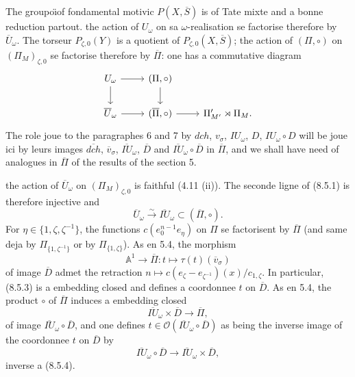 \documentclass[11pt,a4paper]{article}
\theoremstyle{plain}
\theoremstyle{definition}
\newcommand{\dch}{\mathit{dch}}
\newcommand{\A}{\mathbb{A}}
\begin{document}
\subsection{}
The groupo\"{\i}of fondamental motivic $P(X, \overline{S})$ is of Tate mixte and a bonne reduction partout. the action of $U_\omega$ on sa $\omega$-realisation se factorise therefore by $\overline{U}_\omega$. The torseur $P_{\zeta,0}(Y)$ is a quotient of $P_{\zeta,0}(X, \overline{S})$; the action of $(\Pi, \circ)$ on $(\Pi_M)_{\zeta,0}$ se factorise therefore by $\overline{\Pi}$: one has a commutative diagram
\begin{equation}\label{eq:8.5.1}
\begin{tikzcd}
U_\omega \arrow{r} \arrow{d} & (\Pi, \circ) \arrow{d} \\
\overline{U}_\omega \arrow{r} & (\overline{\Pi}, \circ) \arrow{r} & \Pi'_{M'} \rtimes \Pi_M.
\end{tikzcd}
\end{equation}
The role joue to the paragraphes 6 and 7 by $\dch$, $v_\sigma$, $IU_\omega$, $D$, $IU_\omega \circ D$ will be joue ici by leurs images $\overline{\dch}$, $\overline{v}_\sigma$, $\overline{IU}_\omega$, $\overline{D}$ and $\overline{IU}_\omega \circ \overline{D}$ in $\overline{\Pi}$, and we shall have need of analogues in $\overline{\Pi}$ of the results of the section 5.

the action of $\overline{U}_\omega$ on $(\Pi_M)_{\zeta,0}$ is faithful (4.11 (ii)). The seconde ligne of (8.5.1) is therefore injective and
\begin{equation}\label{eq:8.5.2}
\overline{U}_\omega \xrightarrow{\sim} \overline{IU}_\omega \subset (\overline{\Pi}, \circ).
\end{equation}
For $\eta \in \{1, \zeta, \zeta^{-1}\}$, the functions $c(e_0^{n-1}e_\eta)$ on $\Pi$ se factorisent by $\overline{\Pi}$ (and same deja by $\Pi_{\{1,\zeta^{-1}\}}$ or by $\Pi_{\{1,\zeta\}}$). As en 5.4, the morphism
\begin{equation}\label{eq:8.5.3}
\A^1 \to \overline{\Pi}: t \mapsto \tau(t)(\overline{v}_\sigma)
\end{equation}
of image $\overline{D}$ admet the retraction $n \mapsto c(e_\zeta - e_{\zeta^{-1}})(x)/c_{1,\zeta}$. In particular, (8.5.3) is a embedding closed and defines a coordonnee $t$ on $\overline{D}$. As en 5.4, the product $\circ$ of $\overline{\Pi}$ induces a embedding closed
\begin{equation}\label{eq:8.5.4}
\overline{IU}_\omega \times \overline{D} \to \overline{\Pi},
\end{equation}
of image $\overline{IU}_\omega \circ \overline{D}$, and one defines $t \in \mathcal{O}(\overline{IU}_\omega \circ \overline{D})$ as being the inverse image of the coordonnee $t$ on $\overline{D}$ by
\begin{equation}\label{eq:8.5.5}
\overline{IU}_\omega \circ \overline{D} \to \overline{IU}_\omega \times \overline{D},
\end{equation}
inverse a (8.5.4).
\end{document}
